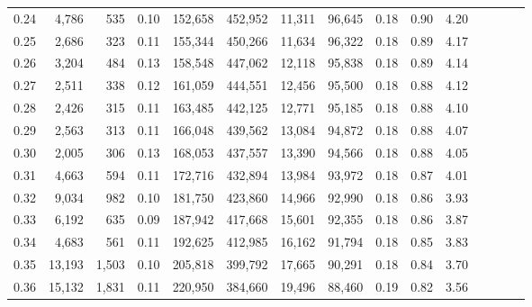 \begin{tabular}{rrrcrrrrrrrrrrr}
0.24 &   4,786 &    535 &                                       0.10 &  152,658 &  452,952 &   11,311 &   96,645 &  0.18 &  0.90 &                         4.20 \\
0.25 &   2,686 &    323 &                                       0.11 &  155,344 &  450,266 &   11,634 &   96,322 &  0.18 &  0.89 &                         4.17 \\
0.26 &   3,204 &    484 &                                       0.13 &  158,548 &  447,062 &   12,118 &   95,838 &  0.18 &  0.89 &                         4.14 \\
0.27 &   2,511 &    338 &                                       0.12 &  161,059 &  444,551 &   12,456 &   95,500 &  0.18 &  0.88 &                         4.12 \\
0.28 &   2,426 &    315 &                                       0.11 &  163,485 &  442,125 &   12,771 &   95,185 &  0.18 &  0.88 &                         4.10 \\
0.29 &   2,563 &    313 &                                       0.11 &  166,048 &  439,562 &   13,084 &   94,872 &  0.18 &  0.88 &                         4.07 \\
0.30 &   2,005 &    306 &                                       0.13 &  168,053 &  437,557 &   13,390 &   94,566 &  0.18 &  0.88 &                         4.05 \\
0.31 &   4,663 &    594 &                                       0.11 &  172,716 &  432,894 &   13,984 &   93,972 &  0.18 &  0.87 &                         4.01 \\
0.32 &   9,034 &    982 &                                       0.10 &  181,750 &  423,860 &   14,966 &   92,990 &  0.18 &  0.86 &                         3.93 \\
0.33 &   6,192 &    635 &                                       0.09 &  187,942 &  417,668 &   15,601 &   92,355 &  0.18 &  0.86 &                         3.87 \\
0.34 &   4,683 &    561 &                                       0.11 &  192,625 &  412,985 &   16,162 &   91,794 &  0.18 &  0.85 &                         3.83 \\
0.35 &  13,193 &  1,503 &                                       0.10 &  205,818 &  399,792 &   17,665 &   90,291 &  0.18 &  0.84 &                         3.70 \\
0.36 &  15,132 &  1,831 &                                       0.11 &  220,950 &  384,660 &   19,496 &   88,460 &  0.19 &  0.82 &                         3.56 \\

\end{tabular}
